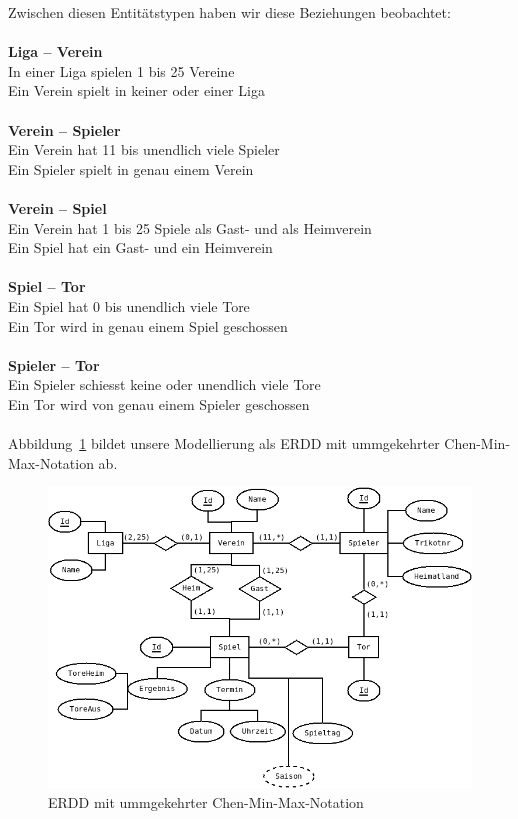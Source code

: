 \documentclass[
10pt,
a4paper
]{scrartcl}
\begin{document}
Zwischen diesen Entitätstypen haben wir diese Beziehungen beobachtet:\\
\\
\textbf{Liga – Verein}\\
In einer Liga spielen 1 bis 25 Vereine\\
Ein Verein spielt in keiner oder einer Liga\\
\\
\textbf{Verein – Spieler}\\
Ein Verein hat 11 bis unendlich viele Spieler\\
Ein Spieler spielt in genau einem Verein\\
\\
\textbf{Verein – Spiel}\\
Ein Verein hat 1 bis 25 Spiele als Gast- und als Heimverein\\
Ein Spiel hat ein Gast- und ein Heimverein\\
\\
\textbf{Spiel – Tor}\\
Ein Spiel hat 0 bis unendlich viele Tore\\
Ein Tor wird in genau einem Spiel geschossen \\
\\
\textbf{Spieler – Tor}\\
Ein Spieler schiesst keine oder unendlich viele Tore\\
Ein Tor wird von genau einem Spieler geschossen \\ 
\\

Abbildung~\ref{fig1} bildet unsere Modellierung als ERDD mit ummgekehrter Chen-Min-Max-Notation ab.

\begin{figure}[hb]
	\centering
  \includegraphics[scale=0.5]{bundesliga_iter1.png}
	\caption{ERDD mit ummgekehrter Chen-Min-Max-Notation}
	\label{fig1}
\end{figure}
\end{document}

